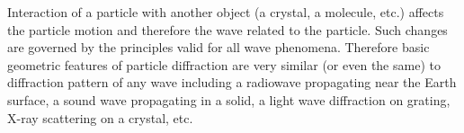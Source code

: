 Interaction of a particle with another object (a crystal, a molecule, etc.) affects the particle motion and therefore the wave related to the particle. Such changes are governed by the principles valid for all wave phenomena. Therefore basic geometric features of particle diffraction are very similar (or even the same) to diffraction pattern of any wave including a radiowave propagating near the Earth surface, a sound wave propagating in a solid, a light wave diffraction on grating, X-ray scattering on a crystal, etc.

